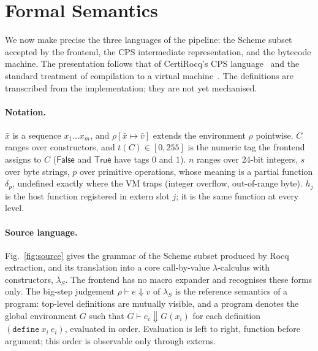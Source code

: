 
\newcommand{\kw}[1]{\mathsf{#1}}
\newcommand{\sch}[1]{\texttt{#1}}
\newcommand{\ext}[1]{\kw{ext}_{#1}}
\newcommand{\clo}{\kw{clo}}
\newcommand{\kont}{\kw{kont}}
\newcommand{\nullk}{\kw{null}}
\newcommand{\enc}{\kw{encore}}
\newcommand{\sem}[1]{[\![#1]\!]}
\newcommand{\instr}[1]{\textsc{#1}}

\section{Formal Semantics}
\label{sec:semantics}

We now make precise the three languages of the pipeline: the Scheme subset accepted by the frontend, the CPS intermediate representation, and the bytecode machine.
The presentation follows that of CertiRocq's CPS language~\cite{paraskevopoulou2019closure} and the standard treatment of compilation to a virtual machine~\cite{leroy2009mechanized}.
The definitions are transcribed from the implementation; they are not yet mechanised.

\paragraph{Notation.}
$\bar{x}$ is a sequence $x_1 \dots x_m$, and $\rho[\bar{x} \mapsto \bar{v}]$ extends the environment $\rho$ pointwise.
$C$ ranges over constructors, and $t(C) \in [0, 255]$ is the numeric tag the frontend assigns to $C$ ($\kw{False}$ and $\kw{True}$ have tags $0$ and $1$).
$n$ ranges over 24-bit integers, $s$ over byte strings, $p$ over primitive operations, whose meaning is a partial function $\delta_p$, undefined exactly where the VM traps (integer overflow, out-of-range byte).
$h_j$ is the host function registered in extern slot $j$; it is the same function at every level.

\paragraph{Source language.}
Fig.~\ref{fig:source} gives the grammar of the Scheme subset produced by Rocq extraction, and its translation into a core call-by-value $\lambda$-calculus with constructors, $\lambda_S$.
The frontend has no macro expander and recognises these forms only.
The big-step judgement $\rho \vdash e \Downarrow v$ of $\lambda_S$ is the reference semantics of a program: top-level definitions are mutually visible, and a program denotes the global environment $G$ such that $G \vdash e_i \Downarrow G(x_i)$ for each definition $(\sch{define}\ x_i\ e_i)$, evaluated in order.
Evaluation is left to right, function before argument; this order is observable only through externs.

